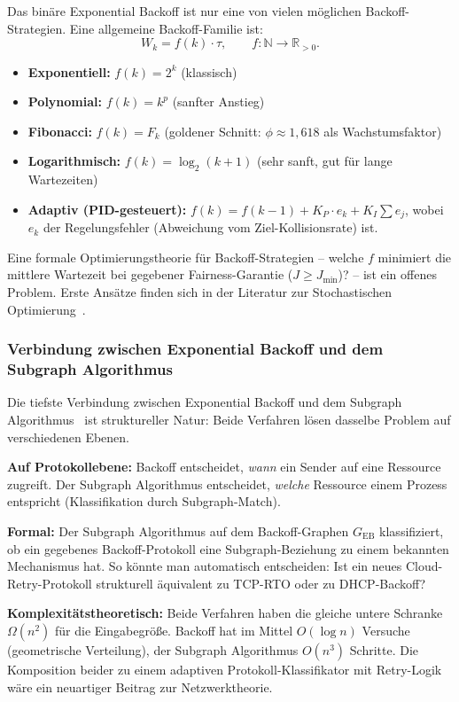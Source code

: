 ﻿\documentclass[a4paper,12pt]{article}
\theoremstyle{definition}
\begin{document}
Das binäre Exponential Backoff ist nur eine von vielen
möglichen Backoff-Strategien. Eine allgemeine Backoff-Familie
ist:
\[
  W_k = f(k) \cdot \tau, \qquad f: \mathbb{N} \to \mathbb{R}_{> 0}.
\]
\begin{itemize}
  \item \textbf{Exponentiell:} $f(k) = 2^k$ (klassisch)
  \item \textbf{Polynomial:} $f(k) = k^p$ (sanfter Anstieg)
  \item \textbf{Fibonacci:} $f(k) = F_k$ (goldener Schnitt:
        $\phi \approx 1{,}618$ als Wachstumsfaktor)
  \item \textbf{Logarithmisch:} $f(k) = \log_2(k+1)$
        (sehr sanft, gut für lange Wartezeiten)
  \item \textbf{Adaptiv (PID-gesteuert):}
        $f(k) = f(k-1) + K_P \cdot e_k + K_I \sum e_j$,
        wobei $e_k$ der Regelungsfehler (Abweichung vom
        Ziel-Kollisionsrate) ist.
\end{itemize}

Eine formale Optimierungstheorie für Backoff-Strategien --
welche $f$ minimiert die mittlere Wartezeit bei gegebener
Fairness-Garantie ($J \geq J_{\min}$)? -- ist ein
offenes Problem. Erste Ansätze finden sich in der
Literatur zur Stochastischen Optimierung~\cite{spall2003introduction}.

\subsubsection{Verbindung zwischen Exponential Backoff und
dem Subgraph Algorithmus}

Die tiefste Verbindung zwischen Exponential Backoff und dem
Subgraph Algorithmus~\cite{epp2026subgraph} ist struktureller
Natur: Beide Verfahren lösen dasselbe Problem auf
verschiedenen Ebenen.

\textbf{Auf Protokollebene:} Backoff entscheidet, \emph{wann}
ein Sender auf eine Ressource zugreift.
Der Subgraph Algorithmus entscheidet, \emph{welche} Ressource
einem Prozess entspricht (Klassifikation durch Subgraph-Match).

\textbf{Formal:} Der Subgraph Algorithmus auf dem
Backoff-Graphen $G_{\mathrm{EB}}$ klassifiziert, ob ein
gegebenes Backoff-Protokoll eine Subgraph-Beziehung zu einem
bekannten Mechanismus hat. So könnte man automatisch
entscheiden: Ist ein neues Cloud-Retry-Protokoll strukturell
äquivalent zu TCP-RTO oder zu DHCP-Backoff?

\textbf{Komplexitätstheoretisch:} Beide Verfahren haben die
gleiche untere Schranke $\Omega(n^2)$ für die Eingabegröße.
Backoff hat im Mittel $O(\log n)$ Versuche (geometrische
Verteilung), der Subgraph Algorithmus $O(n^3)$ Schritte.
Die Komposition beider zu einem adaptiven Protokoll-Klassifikator
mit Retry-Logik wäre ein neuartiger Beitrag zur
Netzwerktheorie.
\end{document}
